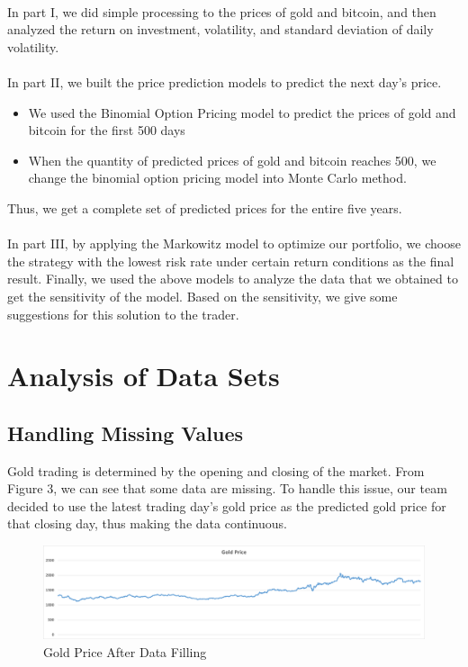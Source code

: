 \documentclass[12pt]{article}
\begin{document}
\paragraph{}
In part I, we did simple processing to the prices of gold and bitcoin, and then analyzed the return on investment, volatility, and standard deviation of daily volatility.
\paragraph{}
In part II, we built the price prediction models to predict the next day's price. 
\begin{itemize}
    \item We used the Binomial Option Pricing model to predict the prices of gold and bitcoin for the first 500 days
    \item When the quantity of predicted prices of gold and bitcoin reaches 500, we change the binomial option pricing model into Monte Carlo method. 
\end{itemize}
Thus, we get a complete set of predicted prices for the entire five years.
\paragraph{}
In part III, by applying the Markowitz model to optimize our portfolio, we choose the strategy with the lowest risk rate under certain return conditions as the final result.
Finally, we used the above models to analyze the data that we obtained to get the sensitivity of the model. Based on the sensitivity, we give some suggestions for this solution to the trader. 
\section{Analysis of Data Sets }
\subsection{Handling Missing Values}
Gold trading is determined by the opening and closing of the market. From Figure 3, we can see that some data are missing.  To handle this issue, our team decided to use the latest trading day's gold price as the predicted gold price for that closing day, thus making the data continuous.
\begin{figure}[htp]
    \centering
        \includegraphics[width=.8\linewidth]{figures/gold_price_value.png}  
        \caption{Gold Price After Data Filling}
        \label{fig:gold_price}
\end{figure}
\end{document}
